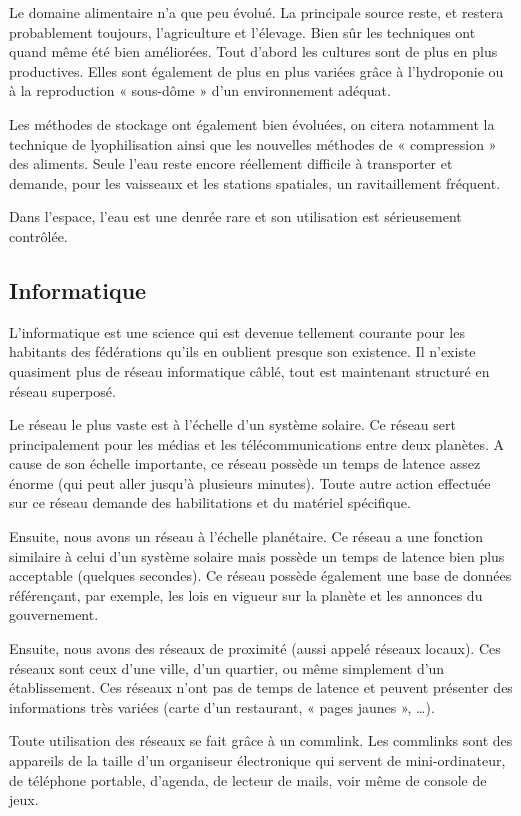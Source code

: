 \begin{multicols}{2}
Le domaine alimentaire n’a que peu évolué. La principale source reste, et restera probablement toujours, l’agriculture et l’élevage. Bien sûr les techniques ont quand même été bien améliorées. Tout d’abord les cultures sont de plus en plus productives. Elles sont également de plus en plus variées grâce à l’hydroponie ou à la reproduction « sous-dôme » d’un environnement adéquat.

Les méthodes de stockage ont également bien évoluées, on citera notamment la technique de lyophilisation ainsi que les nouvelles méthodes de « compression » des aliments. Seule l’eau reste encore réellement difficile à transporter et demande, pour les vaisseaux et les stations spatiales, un ravitaillement fréquent.  

Dans l’espace, l’eau est une denrée rare et son utilisation est sérieusement contrôlée. 

\subsection{Informatique}

L’informatique est une science qui est devenue tellement courante pour les habitants des fédérations qu’ils en oublient presque son existence. Il n’existe quasiment plus de réseau informatique câblé, tout est maintenant structuré en réseau superposé.

Le réseau le plus vaste est à l’échelle d’un système solaire. Ce réseau sert principalement pour les médias et les télécommunications entre deux planètes. A cause de son échelle importante, ce réseau possède un temps de latence assez énorme (qui peut aller jusqu’à plusieurs minutes). Toute autre action effectuée sur ce réseau demande des habilitations et du matériel spécifique.

Ensuite, nous avons un réseau à l’échelle planétaire. Ce réseau a une fonction similaire à celui d’un système solaire mais possède un temps de latence bien plus acceptable (quelques secondes). Ce réseau possède également une base de données référençant, par exemple, les lois en vigueur sur la planète et les annonces du gouvernement. 

Ensuite, nous avons des réseaux de proximité (aussi appelé réseaux locaux).  Ces réseaux sont ceux d’une ville, d’un quartier, ou même simplement d’un établissement. Ces réseaux n’ont pas de temps de latence et peuvent présenter des informations très variées (carte d’un restaurant, « pages jaunes », …).

Toute utilisation des réseaux se fait grâce à un commlink. Les commlinks sont des appareils de la taille d’un organiseur électronique qui servent de mini-ordinateur, de téléphone portable, d’agenda, de lecteur de mails, voir même de console de jeux.


\end{multicols}
